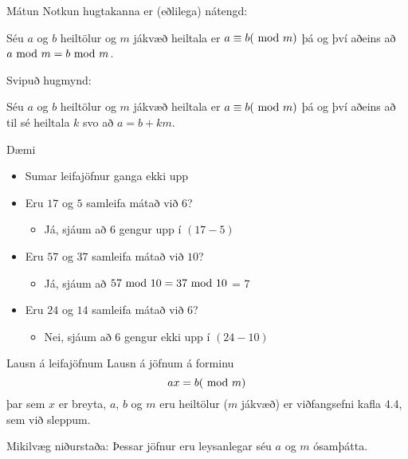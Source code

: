 \documentclass[handout]{beamer}
\begin{document}
\begin{frame}{Mátun}
    Notkun hugtakanna er (eðlilega) nátengd:
    \begin{tcolorbox}
        Séu $a$ og $b$ heiltölur og $m$ jákvæð heiltala er $a \equiv b (\ \text{mod}\ m)$ þá og því aðeins að $a \ \text{mod}\ m = b \ \text{mod}\ m$.
    \end{tcolorbox}
    Svipuð hugmynd:
    \begin{tcolorbox}
        Séu $a$ og $b$ heiltölur og $m$ jákvæð heiltala er $a \equiv b (\ \text{mod}\ m)$ þá og því aðeins að til sé heiltala $k$ svo að $a = b + km$.
    \end{tcolorbox}
\end{frame}

\begin{frame}{Dæmi}
    \begin{itemize}
        \item Sumar leifajöfnur ganga ekki upp
        \item Eru $17$ og $5$ samleifa mátað við $6$? \pause
        \begin{itemize}
            \item Já, sjáum að 6 gengur upp í $(17-5)$
        \end{itemize}
        \item Eru $57$ og $37$ samleifa mátað við $10$? \pause
        \begin{itemize}
            \item Já, sjáum að $57 \ \text{mod}\ 10 = 37 \ \text{mod}\ 10$ = 7
        \end{itemize}
        \item Eru $24$ og $14$ samleifa mátað við $6$? \pause
        \begin{itemize}
            \item Nei, sjáum að 6 gengur ekki upp í $(24-10)$
        \end{itemize}
    \end{itemize}    
\end{frame}

\begin{frame}{Lausn á leifajöfnum}
    Lausn á jöfnum á forminu 
    \[
        ax = b(\ \text{mod}\ m)
    \]
    þar sem $x$ er breyta, $a$, $b$ og $m$ eru heiltölur ($m$ jákvæð) er viðfangsefni kafla 4.4, sem við sleppum.

    \vspace{0.5cm}

    Mikilvæg niðurstaða: Þessar jöfnur eru leysanlegar séu $a$ og $m$ ósamþátta.
\end{frame}
\end{document}
